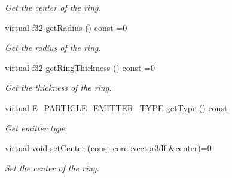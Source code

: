 \begin{DoxyCompactItemize}
\begin{DoxyCompactList}\small\item\em Get the center of the ring. \end{DoxyCompactList}\item 
\mbox{\label{classirr_1_1scene_1_1IParticleRingEmitter_af2a3e9b7a946359159e75d298968b6d8}} 
virtual \hyperlink{namespaceirr_a0277be98d67dc26ff93b1a6a1d086b07}{f32} \hyperlink{classirr_1_1scene_1_1IParticleRingEmitter_af2a3e9b7a946359159e75d298968b6d8}{get\+Radius} () const =0
\begin{DoxyCompactList}\small\item\em Get the radius of the ring. \end{DoxyCompactList}\item 
\mbox{\label{classirr_1_1scene_1_1IParticleRingEmitter_a6148ae3c6186d32f3714f83bbb71034c}} 
virtual \hyperlink{namespaceirr_a0277be98d67dc26ff93b1a6a1d086b07}{f32} \hyperlink{classirr_1_1scene_1_1IParticleRingEmitter_a6148ae3c6186d32f3714f83bbb71034c}{get\+Ring\+Thickness} () const =0
\begin{DoxyCompactList}\small\item\em Get the thickness of the ring. \end{DoxyCompactList}\item 
\mbox{\label{classirr_1_1scene_1_1IParticleRingEmitter_adbf6ff1bd1d25ee40e97bb17b152136f}} 
virtual \hyperlink{namespaceirr_1_1scene_a3e251a881c886884a78adea2e546272b}{E\+\_\+\+P\+A\+R\+T\+I\+C\+L\+E\+\_\+\+E\+M\+I\+T\+T\+E\+R\+\_\+\+T\+Y\+PE} \hyperlink{classirr_1_1scene_1_1IParticleRingEmitter_adbf6ff1bd1d25ee40e97bb17b152136f}{get\+Type} () const
\begin{DoxyCompactList}\small\item\em Get emitter type. \end{DoxyCompactList}\item 
\mbox{\label{classirr_1_1scene_1_1IParticleRingEmitter_abb0b2574e3ffd07fad37328483722997}} 
virtual void \hyperlink{classirr_1_1scene_1_1IParticleRingEmitter_abb0b2574e3ffd07fad37328483722997}{set\+Center} (const \hyperlink{namespaceirr_1_1core_ae6e2b2a6c552833ebbd5b7463d03586b}{core\+::vector3df} \&center)=0
\begin{DoxyCompactList}\small\item\em Set the center of the ring. \end{DoxyCompactList}\item 

\end{DoxyCompactItemize}
